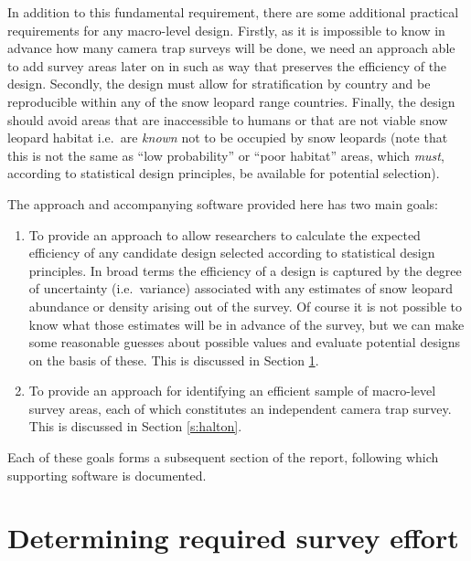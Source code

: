 \documentclass[a4paper,11pt]{article} %
\begin{document}
In addition to this fundamental requirement, there are some additional practical requirements for any macro-level design. Firstly, as it is impossible to know in advance how many camera trap surveys will be done, we need an approach able to add survey areas later on in such as way that preserves the efficiency of the design. Secondly, the design must allow for stratification by country and be reproducible within any of the snow leopard range countries. Finally, the design should avoid areas that are inaccessible to humans or that are not viable snow leopard habitat i.e.\ are {\it known} not to be occupied by snow leopards (note that this is not the same as ``low probability'' or ``poor habitat'' areas, which {\it must}, according to statistical design principles, be available for potential selection).

The approach and accompanying software provided here has two main goals:
\begin{enumerate}
\item To provide an approach to allow researchers to calculate the expected efficiency of any candidate design selected according to statistical design principles. In broad terms the efficiency of a design is captured by the degree of uncertainty (i.e.\ variance) associated with any estimates of snow leopard abundance or density arising out of the survey. Of course it is not possible to know what those estimates will be in advance of the survey, but we can make some reasonable guesses about possible values and evaluate potential designs on the basis of these. This is discussed in Section \ref{s:effort}.
\item To provide an approach for identifying an efficient sample of macro-level survey areas, each of which constitutes an independent camera trap survey. This is discussed in Section \ref{s:halton}.
\end{enumerate}

Each of these goals forms a subsequent section of the report, following which supporting software is documented.

\section{Determining required survey effort} \label{s:effort}
\end{document}
